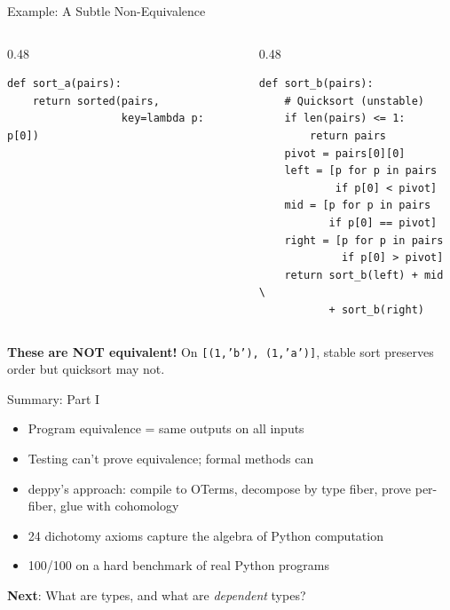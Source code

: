 \documentclass[aspectratio=169,11pt]{beamer}
\begin{document}
\begin{frame}[fragile]{Example: A Subtle Non-Equivalence}
\begin{columns}
\begin{column}{0.48\textwidth}
\begin{lstlisting}[language=deppy,title={\textbf{Stable sort}}]
def sort_a(pairs):
    return sorted(pairs,
                  key=lambda p: p[0])
\end{lstlisting}
\end{column}
\begin{column}{0.48\textwidth}
\begin{lstlisting}[language=deppy,title={\textbf{Unstable sort}}]
def sort_b(pairs):
    # Quicksort (unstable)
    if len(pairs) <= 1:
        return pairs
    pivot = pairs[0][0]
    left = [p for p in pairs
            if p[0] < pivot]
    mid = [p for p in pairs
           if p[0] == pivot]
    right = [p for p in pairs
             if p[0] > pivot]
    return sort_b(left) + mid \
           + sort_b(right)
\end{lstlisting}
\end{column}
\end{columns}

\vspace{0.5em}
\textbf{These are NOT equivalent!} On \texttt{[(1,'b'), (1,'a')]},
stable sort preserves order but quicksort may not.
\end{frame}

\begin{frame}{Summary: Part I}
\begin{itemize}
\item Program equivalence = same outputs on all inputs
\item Testing can't prove equivalence; formal methods can
\item deppy's approach: compile to OTerms, decompose by type fiber,
  prove per-fiber, glue with cohomology
\item 24 dichotomy axioms capture the algebra of Python computation
\item 100/100 on a hard benchmark of real Python programs
\end{itemize}

\vspace{1em}
\begin{center}
\textbf{Next}: What are types, and what are \emph{dependent} types?
\end{center}
\end{frame}
\end{document}
